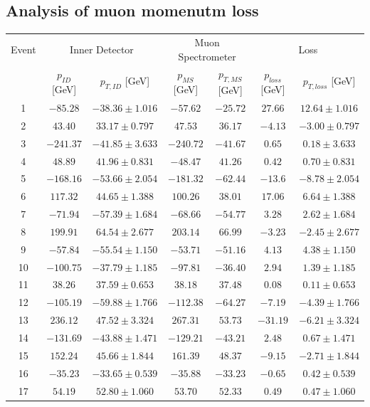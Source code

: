 \documentclass[twoside,        %
               BCOR12mm,       %
               ngerman,english, %
               fleqn,headsepline=false,footsepline=false
              ]{Vorlage/MFPREPORT}
\begin{document}
\subsection{Analysis of muon momenutm loss}
\begin{table}
  \centering
  \begin{tabular}{|c|c|c|c|c|c|c|}
  \hline
  Event&\multicolumn{2}{c|}{Inner Detector}&\multicolumn{2}{c|}{Muon Spectrometer}&\multicolumn{2}{c|}{Loss}\\
  &$p_{ID}$ [GeV]&$p_{T,ID}$ [GeV]&$p_{MS}$ [GeV]&$p_{T,MS}$ [GeV]&$p_{loss}$ [GeV]&$p_{T,loss}$ [GeV]\\
  \hline
  1&$-85.28$&$-38.36\pm 1.016$&$-57.62$&$-25.72$&$27.66$&$12.64\pm 1.016$\\
  2&$43.40$&$33.17\pm 0.797$&$47.53$&$36.17$&$-4.13$&$-3.00\pm 0.797$\\
  3&$-241.37$&$-41.85\pm 3.633$&$-240.72$&$-41.67$&$0.65$&$0.18\pm 3.633$\\
  4&$48.89$&$41.96\pm 0.831$&$-48.47$&$41.26$&$0.42$&$0.70\pm 0.831$\\
  5&$-168.16$&$-53.66\pm 2.054$&$-181.32$&$-62.44$&$-13.6$&$-8.78\pm 2.054$\\
  6&$117.32$&$44.65\pm 1.388$&$100.26$&$38.01$&$17.06$&$6.64\pm 1.388$\\
  7&$-71.94$&$-57.39\pm 1.684$&$-68.66$&$-54.77$&$3.28$&$2.62\pm 1.684$\\
  8&$199.91$&$64.54\pm 2.677$&$203.14$&$66.99$&$-3.23$&$-2.45 \pm 2.677$\\
  9&$-57.84$&$-55.54\pm 1.150$&$-53.71$&$-51.16$&$4.13$&$4.38\pm 1.150$\\
  10&$-100.75$&$-37.79\pm 1.185$&$-97.81$&$-36.40$&$2.94$&$1.39\pm 1.185$\\
  11&$38.26$&$37.59\pm 0.653$&$38.18$&$37.48$&$0.08$&$0.11\pm 0.653$\\
  12&$-105.19$&$-59.88\pm 1.766$&$-112.38$&$-64.27$&$-7.19$&$-4.39\pm 1.766$\\
  13&$236.12$&$47.52\pm 3.324$&$267.31$&$53.73$&$-31.19$&$-6.21\pm 3.324$\\
  14&$-131.69$&$-43.88\pm 1.471$&$-129.21$&$-43.21$&$2.48$&$0.67\pm 1.471$\\
  15&$152.24$&$45.66\pm 1.844$&$161.39$&$48.37$&$-9.15$&$-2.71\pm 1.844$\\
  16&$-35.23$&$-33.65\pm 0.539$&$-35.88$&$-33.23$&$-0.65$&$0.42\pm 0.539$\\
  17&$54.19$&$52.80\pm 1.060$&$53.70$&$52.33$&$0.49$&$0.47\pm 1.060$\\

\end{tabular}
\end{table}
\end{document}
